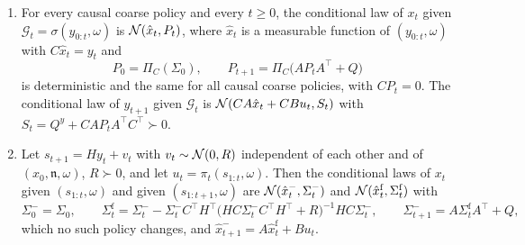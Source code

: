 \begin{lemma}[Separation]\label{lem:apx-separation}
\begin{enumerate}
\item[(a)] For every causal coarse policy and every $t\ge0$, the conditional law of $x_t$ given $\mathcal G_t=\sigma(y_{0:t},\omega)$ is $\mathcal{N}(\hat x_t,P_t)$, where $\hat x_t$ is a measurable function of $(y_{0:t},\omega)$ with $C\hat x_t=y_t$ and
\begin{equation}\label{eq:apx-pt}
P_0=\Pi_C(\Sigma_0),\qquad P_{t+1}=\Pi_C\bigl(AP_tA^\top+Q\bigr)
\end{equation}
is deterministic and the same for all causal coarse policies, with $CP_t=0$. The conditional law of $y_{t+1}$ given $\mathcal G_t$ is $\mathcal{N}(CA\hat x_t+CBu_t,S_t)$ with $S_t=Q^y+CAP_tA^\top C^\top\succ0$.
\item[(b)] Let $s_{t+1}=Hy_t+v_t$ with $v_t\sim\mathcal{N}(0,R)$ independent of each other and of $(x_0,\mathfrak n,\omega)$, $R\succ0$, and let $u_t=\pi_t(s_{1:t},\omega)$. Then the conditional laws of $x_t$ given $(s_{1:t},\omega)$ and given $(s_{1:t+1},\omega)$ are $\mathcal{N}(\hat x^-_t,\Sigma^-_t)$ and $\mathcal{N}(\hat x^{\mathrm f}_t,\Sigma^{\mathrm f}_t)$ with
\begin{equation}\label{eq:apx-record-filter}
\Sigma^-_0=\Sigma_0,\qquad\Sigma^{\mathrm f}_t=\Sigma^-_t-\Sigma^-_tC^\top H^\top\bigl(HC\Sigma^-_tC^\top H^\top+R\bigr)^{-1}HC\Sigma^-_t,\qquad\Sigma^-_{t+1}=A\Sigma^{\mathrm f}_tA^\top+Q ,
\end{equation}
which no such policy changes, and $\hat x^-_{t+1}=A\hat x^{\mathrm f}_t+Bu_t$.
\end{enumerate}
\end{lemma}

